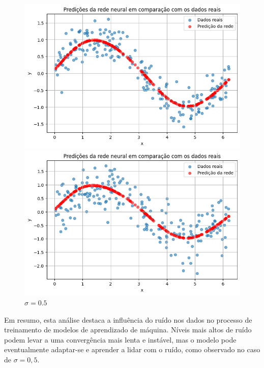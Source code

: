 \begin{figure}[htb]
\begin{minipage}{0.45\textwidth}
		\includegraphics[width=\textwidth]{./0803_imgs/0365_tarefa05/png-241110-192954147-5354434943605266969.png}
	\end{minipage}
	\hfill
	\begin{minipage}{0.45\textwidth}
		\centering
		\caption{$\sigma=0.5$}\label{fig:tarefa05:05:predicoes}
		\includegraphics[width=\textwidth]{./0803_imgs/0365_tarefa05/png-241110-193141249-12530547749698557937.png}
	\end{minipage}
\end{figure}



Em resumo, esta análise destaca a influência do ruído nos dados no processo de 
treinamento de modelos de aprendizado de máquina. Níveis mais altos de ruído 
podem levar a uma convergência mais lenta e instável, mas o modelo pode 
eventualmente adaptar-se e aprender a lidar com o ruído, como observado no caso 
de $\sigma=0,5$.